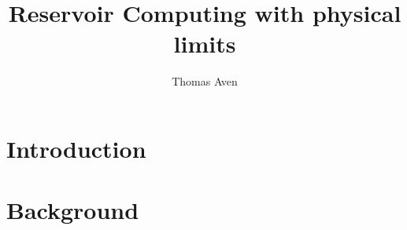\documentclass[journal]{IEEEtran}
\begin{document}
\title{Reservoir Computing with physical limits}
\author{Thomas Aven}
\date{}
\maketitle



\section{Introduction}


\section{Background}

\end{document}
